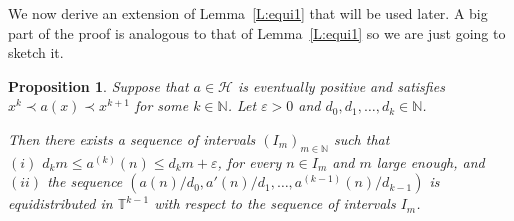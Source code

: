 \documentclass[11pt]{amsart}
\renewcommand{\H}{\mathcal{H}}
\newcommand{\T}{\mathbb{T}}
\newcommand{\N}{\mathbb{N}}
\theoremstyle{plain}
\newtheorem{proposition}[theorem]{Proposition}
\theoremstyle{definition}
\theoremstyle{remark}
\begin{document}
We now derive an extension of Lemma~\ref{L:equi1} that will be used
later.  A big part of the proof is analogous to that of
Lemma~\ref{L:equi1} so we are  just going to sketch it.
\begin{proposition}\label{L:equi2}
  Suppose that $a\in \H$ is eventually positive and satisfies
  $x^k\prec a(x)\prec x^{k+1}$ for some $k\in\N$.
Let   $\varepsilon>0$  and $d_0,d_1,\ldots,d_k\in\N$.

  Then   there exists a sequence of intervals
  $(I_m)_{m\in\N}$  such that \\
  $(i)$ $d_k m\leq a^{(k)}(n)\leq d_k m+\varepsilon$, for every $n\in I_m$ and $m$ large enough, and \\
  $(ii)$ the sequence $(a(n)/d_0,a'(n)/d_1,\ldots,
  a^{(k-1)}(n)/d_{k-1})$ is equidistributed in $\T^{k-1}$ with respect
  to the sequence of intervals $I_m$.
\end{proposition}
\end{document}
